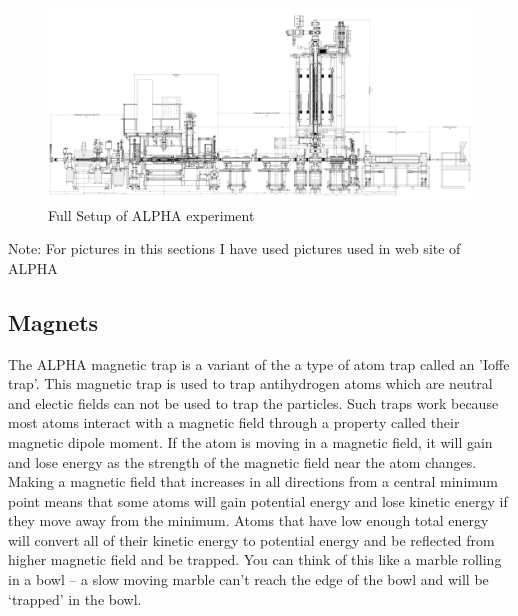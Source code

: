 \documentclass{article}
\begin{document}
\begin{figure}[h]
\centering
\includegraphics[scale=0.09]{full_map}
\caption{Full Setup of ALPHA experiment}
\label{fig:full_map}
\end{figure}

Note: For pictures in this sections I have used pictures used in web site of ALPHA 
\subsection{Magnets}
\label{Magnets} 
The ALPHA magnetic trap is a variant of the a type of atom trap called an 'Ioffe trap'. This magnetic trap is used to trap antihydrogen atoms which are neutral and electic fields can not be used to trap the particles. Such traps work because most atoms interact with a magnetic field through a property called their magnetic dipole moment. If the atom is moving in a magnetic field, it will gain and lose energy as the strength of the magnetic field near the atom changes. Making a magnetic field that increases in all directions from a central minimum point means that some atoms will gain potential energy and lose kinetic energy if they move away from the minimum. Atoms that have low enough total energy will convert all of their kinetic energy to potential energy and be reflected from higher magnetic field and be trapped. You can think of this like a marble rolling in a bowl -- a slow moving marble can't reach the edge of the bowl and will be `trapped' in the bowl.
\end{document}
